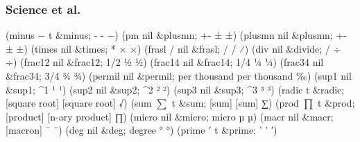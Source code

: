 \documentclass[11pt]{article}
\begin{document}
\subsubsection{Science et al.}
\label{sec-1-3-5}
(minus $\minus$ t \&minus; - - −)
(pm \textpm{} nil \&plusmn; +- ± ±)
(plusmn \textpm{} nil \&plusmn; +- ± ±)
(times \texttimes{} nil \&times; * × ×)
(frasl / nil \&frasl; / / ⁄)
(div \textdiv{} nil \&divide; / ÷ ÷)
(frac12 \textonehalf{} nil \&frac12; 1/2 ½ ½)
(frac14 \textonequarter{} nil \&frac14; 1/4 ¼ ¼)
(frac34 \textthreequarters{} nil \&frac34; 3/4 ¾ ¾)
(permil \textperthousand{} nil \&permil; per thousand per thousand ‰)
(sup1 \textonesuperior{} nil \&sup1; \^{}1 ¹ ¹)
(sup2 \texttwosuperior{} nil \&sup2; \^{}2 ² ²)
(sup3 \textthreesuperior{} nil \&sup3; \^{}3 ³ ³)
(radic \sqrt{\,} t \&radic; [square root] [square root] √)
(sum $\sum$ t \&sum; [sum] [sum] ∑)
(prod $\prod$ t \&prod; [product] [n-ary product] ∏)
(micro \textmu{} nil \&micro; micro µ µ)
(macr \textasciimacron{} nil \&macr; [macron] ¯ ¯)
(deg \textdegree{} nil \&deg; degree ° °)
(prime $\prime$ t \&prime; ' ' ′)
\end{document}
